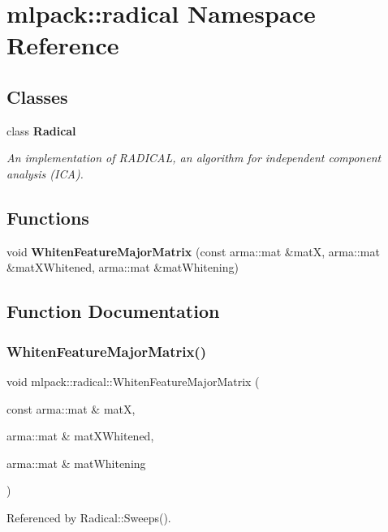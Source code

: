 \section{mlpack\+:\+:radical Namespace Reference}
\label{namespacemlpack_1_1radical}
\subsection*{Classes}
\begin{DoxyCompactItemize}
\item 
class \textbf{ Radical}
\begin{DoxyCompactList}\small\item\em An implementation of R\+A\+D\+I\+C\+AL, an algorithm for independent component analysis (I\+CA). \end{DoxyCompactList}\end{DoxyCompactItemize}
\subsection*{Functions}
\begin{DoxyCompactItemize}
\item 
void \textbf{ Whiten\+Feature\+Major\+Matrix} (const arma\+::mat \&matX, arma\+::mat \&mat\+X\+Whitened, arma\+::mat \&mat\+Whitening)
\end{DoxyCompactItemize}


\subsection{Function Documentation}
\mbox{\label{namespacemlpack_1_1radical_ad2cb37f7f394d92d8fa93e154713b841}} 
\subsubsection{Whiten\+Feature\+Major\+Matrix()}
{\footnotesize\ttfamily void mlpack\+::radical\+::\+Whiten\+Feature\+Major\+Matrix (\begin{DoxyParamCaption}\item[{const arma\+::mat \&}]{matX,  }\item[{arma\+::mat \&}]{mat\+X\+Whitened,  }\item[{arma\+::mat \&}]{mat\+Whitening }\end{DoxyParamCaption})}



Referenced by Radical\+::\+Sweeps().

